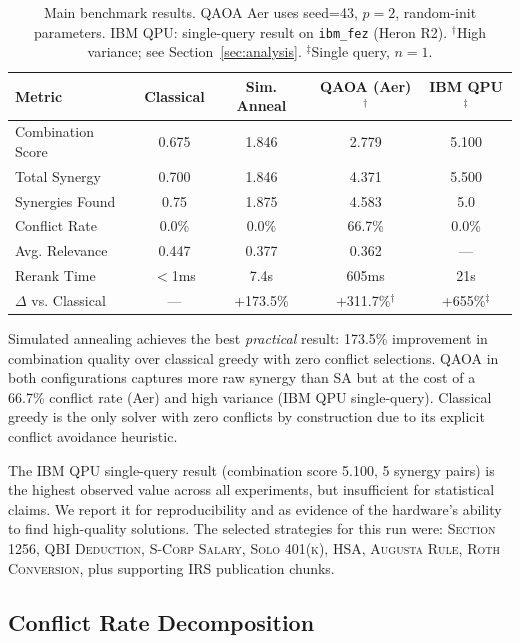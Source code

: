 \documentclass{article}
\begin{document}
\begin{table}[h]
\centering
\caption{Main benchmark results. QAOA Aer uses seed=43, $p=2$,
random-init parameters. IBM QPU: single-query result on \texttt{ibm\_fez}
(Heron R2). $^\dagger$High variance; see Section~\ref{sec:analysis}.
$^\ddagger$Single query, $n=1$.}
\label{tab:main}
\begin{tabular}{lcccc}
\toprule
Metric & Classical & Sim. Anneal & QAOA (Aer)$^\dagger$ & IBM QPU$^\ddagger$ \\
\midrule
Combination Score & 0.675 & 1.846 & 2.779 & 5.100 \\
Total Synergy & 0.700 & 1.846 & 4.371 & 5.500 \\
Synergies Found & 0.75 & 1.875 & 4.583 & 5.0 \\
Conflict Rate & 0.0\% & 0.0\% & 66.7\% & 0.0\% \\
Avg. Relevance & 0.447 & 0.377 & 0.362 & — \\
Rerank Time & $<$1ms & 7.4s & 605ms & 21s \\
\midrule
$\Delta$ vs. Classical & — & +173.5\% & +311.7\%$^\dagger$ & +655\%$^\ddagger$ \\
\bottomrule
\end{tabular}
\end{table}

Simulated annealing achieves the best \emph{practical} result: 173.5\%
improvement in combination quality over classical greedy with zero
conflict selections. QAOA in both configurations captures more raw
synergy than SA but at the cost of a 66.7\% conflict rate (Aer) and
high variance (IBM QPU single-query). Classical greedy is the only
solver with zero conflicts by construction due to its explicit conflict
avoidance heuristic.

The IBM QPU single-query result (combination score 5.100, 5 synergy
pairs) is the highest observed value across all experiments, but
insufficient for statistical claims. We report it for reproducibility
and as evidence of the hardware's ability to find high-quality
solutions. The selected strategies for this run were: \textsc{Section
1256}, \textsc{QBI Deduction}, \textsc{S-Corp Salary}, \textsc{Solo
401(k)}, \textsc{HSA}, \textsc{Augusta Rule}, \textsc{Roth Conversion},
plus supporting IRS publication chunks.

\subsection{Conflict Rate Decomposition}
\end{document}

